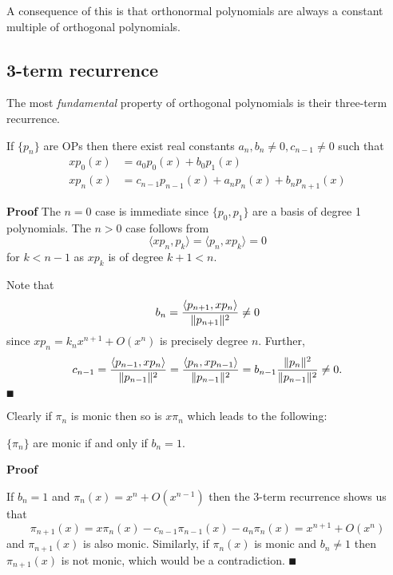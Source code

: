 A consequence of this is that orthonormal polynomials are always a constant multiple of orthogonal polynomials.

\subsection{3-term recurrence}
The most \emph{fundamental} property of orthogonal polynomials is their three-term recurrence.

\begin{theorem} If $\{p_n\}$ are OPs then there exist real constants $a_n, b_n \ensuremath{\neq}0,c_{n-1} \ensuremath{\neq}0$ such that
\begin{align*}
x p_0(x) &= a_0 p_0(x) + b_0 p_1(x)  \\
x p_n(x) &= c_{n-1} p_{n-1}(x) + a_n p_n(x) + b_n p_{n+1}(x)
\end{align*}
\end{theorem}
\textbf{Proof} The $n=0$ case is immediate since $\{p_0,p_1\}$ are a basis of degree 1 polynomials. The $n >0$ case follows from
\[
\ensuremath{\langle}x p_n, p_k\ensuremath{\rangle} = \ensuremath{\langle} p_n, xp_k\ensuremath{\rangle} = 0
\]
for $k < n-1$ as $x p_k$ is of degree $k+1 < n$.

Note that
\[
b_n = {\ensuremath{\langle}p_{n+1}, x p_n\ensuremath{\rangle} \over \|p_{n+1} \|^2} \ensuremath{\neq} 0
\]
since $x p_n = k_n x^{n+1} + O(x^n)$ is precisely degree $n$. Further,
\[
c_{n-1} = {\ensuremath{\langle}p_{n-1}, x p_n\ensuremath{\rangle} \over \|p_{n-1}\|^2 } =
{\ensuremath{\langle}p_n, x p_{n-1}\ensuremath{\rangle}  \over \|p_{n-1}\|^2 } =  b_{n-1}{\|p_n\|^2  \over \|p_{n-1}\|^2 } \ensuremath{\neq} 0.
\]
\ensuremath{\QED}

Clearly if $\ensuremath{\pi}_n$ is monic then so is $x \ensuremath{\pi}_n$ which leads to the following:

\begin{corollary} $\{\ensuremath{\pi}_n\}$ are monic if and only if $b_n =  1$. \end{corollary}
\textbf{Proof}

If $b_n = 1$ and $\ensuremath{\pi}_n(x) = x^n + O(x^{n-1})$ then the 3-term recurrence shows us that
\[
\ensuremath{\pi}_{n+1}(x) = x \ensuremath{\pi}_n(x) - c_{n-1} \ensuremath{\pi}_{n-1}(x) - a_n \ensuremath{\pi}_n(x) = x^{n+1} + O(x^n)
\]
and $\ensuremath{\pi}_{n+1}(x)$ is also monic. Similarly, if $\ensuremath{\pi}_n(x)$ is monic and $b_n \ensuremath{\neq} 1$ then $\ensuremath{\pi}_{n+1}(x)$ is not monic, which would be a contradiction. \ensuremath{\QED}

